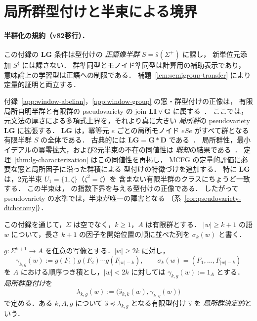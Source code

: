 \section{局所群型付けと半束による境界}
\label{app:local-group}


\paragraph{半群化の規約（v82移行）．}
この付録の $\mathbf{LG}$ 条件は型付けの
\emph{正語像半群} $S=\widehat{s}(\Sigma^+)$ に課し，
新単位元添加 $S^\sharp$ には課さない．
群準同型とモノイド準同型は計算用の補助表示であり，
意味論上の学習型は正語への制限である．
補題~\ref{lem:semigroup-transfer} により定量的証明と両立する．


付録~\ref{app:window-abelian}，\ref{app:window-group} の窓・群型付けの正像は，
有限局所自明半群と有限群の pseudovariety の join $\mathbf{LI}\vee\mathbf{G}$ に属する~\cite[Lemma~7.4]{kuriyamaCFG}．
ここでは，元文法の厚さによる多項式上界を，それより真に大きい
\emph{局所群}の pseudovariety $\mathbf{LG}$ に拡張する．
$\mathbf{LG}$ は，冪等元 $e$ ごとの局所モノイド $eSe$ がすべて群となる有限半群 $S$ の全体である．
古典的には $\mathbf{LG}=\mathbf G*\mathbf D$ である~\cite{Straubing1985,Tilson1987}．
局所群性，最小イデアルの冪零拡大，および2元半束の不在の同値性は
\emph{既知}の結果である~\cite[Proposition~2.3]{AlmeidaEtAl2009}．
定理~\ref{thm:lg-characterization} はこの同値性を再掲し，
MCFG の定量的評価に必要な窓と局所因子に沿った群積による
型付けの特徴づけを追加する．
特に $\mathbf{LG}$ は，2元半束 $U_1=\{1,\zeta\}$（$\zeta^2=\zeta$）を
含まない有限半群のクラスにちょうど一致する．
この半束は，\cite{kuriyamaCFG} の指数下界を与える型付けの正像である．
したがって pseudovariety の水準では，半束が唯一の障害となる
（系~\ref{cor:pseudovariety-dichotomy}）．

この付録を通じて，$\Sigma$ は空でなく，$k\ge1$，$A$ は有限群とする．
$|w|\ge k+1$ の語 $w$ について，長さ $k+1$ の因子を開始位置の順に並べた列を $\sigma_k(w)$ と書く．

\begin{definition}[局所群型付け]
\label{def:local-group-typing}
$g:\Sigma^{k+1}\to A$ を任意の写像とする．$|w|\ge2k$ に対し，
\[
 \gamma_{k,g}(w):=g(F_1)g(F_2)\cdots g(F_{|w|-k}),
 \qquad \sigma_k(w)=(F_1,\ldots,F_{|w|-k})
\]
を $A$ における順序つき積とし，$|w|<2k$ に対しては $\gamma_{k,g}(w):=1_A$ とする．
\emph{局所群型付け}を
\[
 \lambda_{k,g}(w):=\bigl(\widehat{s}_{k,k}(w),\gamma_{k,g}(w)\bigr)
\]
で定める．ある $k,A,g$ について $\widehat{s}\preceq\lambda_{k,g}$ となる有限型付け $\widehat{s}$ を
\emph{局所群決定的}という．
\end{definition}

